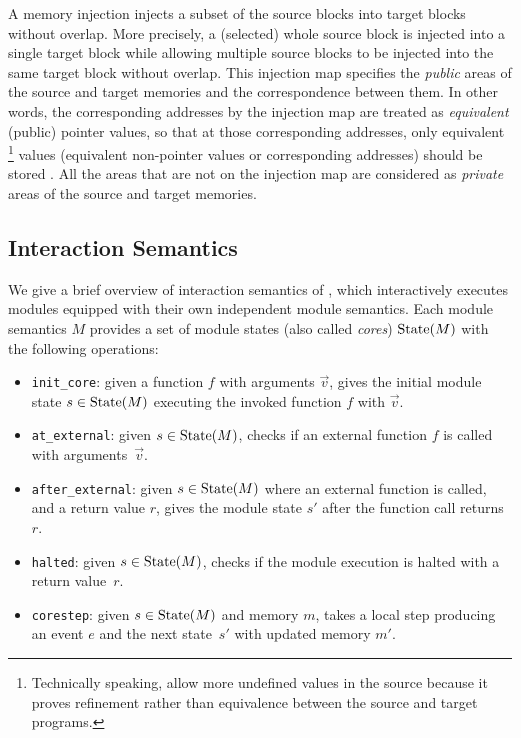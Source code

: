 A memory injection injects a subset of the source blocks into target blocks
without overlap. More precisely, a (selected) whole source block is injected into a single target block
while allowing multiple source blocks to be injected into the same target block without overlap.
This injection map specifies the \emph{public} areas of the source and target memories and the correspondence between them.
In other words, the corresponding addresses by the injection map are treated as \emph{equivalent} (public) pointer values,
so that at those corresponding addresses,
only equivalent%
\footnote{Technically speaking, \cc{} allow more undefined values in the source
  because it proves refinement rather than equivalence between the source and target programs.}
values (\ie equivalent non-pointer values or corresponding addresses) should be stored .
All the areas that are not on the injection map are considered as \emph{private} areas of the source and target memories.





\subsection{Interaction Semantics}

We give a brief overview of interaction semantics of \ccc{}, which
interactively executes modules equipped with their own independent
module semantics. Each module semantics $M$ provides
a set of module states (also called \emph{cores}) $\textrm{State}(M)$ with the following operations:
\begin{itemize}
\item \texttt{init\_core}: given a function $f$ with arguments $\vec{v}$,
  gives the initial module state $s \in \textrm{State}(M)$
  executing the invoked function $f$ with $\vec{v}$.
\item \texttt{at\_external}: given $s \in \textrm{State}(M)$,
  checks if an external function $f$ is called with arguments~$\vec{v}$.
\item \texttt{after\_external}: given $s \in \textrm{State}(M)$
  where an external function is called,
  and a return value $r$,
  gives the module state $s'$
  after the function call returns $r$.
\item \texttt{halted}: given $s \in \textrm{State}(M)$, checks if the module execution is halted with a return value~$r$.
\item \texttt{corestep}: given $s \in \textrm{State}(M)$ and memory $m$, takes a local step producing an event $e$ and the next state~$s'$ with updated memory $m'$.
\end{itemize}


